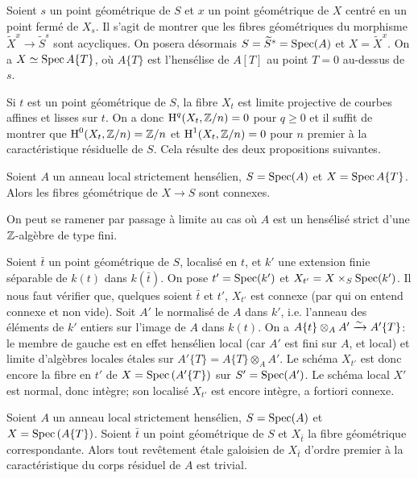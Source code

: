 \documentclass[oneside]{book}
\begin{document}
Soient $s$ un point géométrique de $S$ et $x$ un point géométrique de 
$X$ centré en un point fermé de $X_s$. Il s'agit de montrer que les fibres 
géométriques du morphisme $\widetilde X^x\to \widetilde S^s$ sont 
acycliques. On posera désormais $S=\widetilde S^s=\operatorname{Spec}(A)$ et 
$X=\widetilde X^x$. On a $X\simeq \operatorname{Spec} A\{T\}$, où $A\{T\}$ est l'hensélise 
de $A[T]$ au point $T=0$ au-dessus de $s$. 

Si $t$ est un point géométrique de $S$, la fibre $X_t$ est limite 
projective de courbes affines et lisses sur $t$. On a donc $\operatorname{H}^q(X_t,\mathbb{Z}/n) = 0$ 
pour $q\geqslant 0$ et il suffit de montrer que $\operatorname{H}^0(X_t,\mathbb{Z}/n) = \mathbb{Z}/n$ et 
$\operatorname{H}^1(X_t,\mathbb{Z}/n) = 0$ pour $n$ premier à la caractéristique résiduelle de 
$S$. Cela résulte des deux propositions suivantes. 





\begin{proposition}\label{I:5-2-2}
Soient $A$ un anneau local strictement hensélien, $S=\operatorname{Spec}(A)$ et 
$X=\operatorname{Spec} A\{T\}$. Alors les fibres géométrique de $X\to S$ sont connexes. 
\end{proposition}

On peut se ramener par passage à limite au cas où $A$ est un hensélisé 
strict d'une $\mathbb{Z}$-algèbre de type fini. 

Soient $\bar t$ un point géométrique de $S$, localisé en $t$, et $k'$ une 
extension finie séparable de $k(t)$ dans $k(\bar t)$. On pose $t'=\operatorname{Spec}(k')$ 
et $X_{t'} = X\times_S\operatorname{Spec}(k')$. Il nous faut vérifier que, quelques soient 
$\bar t$ et $t'$, $X_{t'}$ est connexe (par qui on entend connexe et non vide). 
Soit $A'$ le normalisé de $A$ dans $k'$, i.e. l'anneau des éléments de 
$k'$ entiers sur l'image de $A$ dans $k(t)$. On a 
$A\{t\}\otimes_A A'\xrightarrow\sim A'\{T\}$: le membre de gauche est en effet hensélien 
local (car $A'$ est fini sur $A$, et local) et limite d'algèbres locales 
étales sur $A'\{T\}=A\{T\}\otimes_A A'$. Le schéma $X_{t'}$ est donc encore 
la fibre en $t'$ de $X=\operatorname{Spec}\left(A'\{T\}\right)$ sur $S'=\operatorname{Spec}(A')$. Le 
schéma local $X'$ est normal, donc intègre; son localisé $X_{t'}$ est 
encore intègre, a fortiori connexe. 





\begin{proposition}\label{I:5-2-3}
Soient $A$ un anneau local strictement hensélien, $S=\operatorname{Spec}(A)$ et 
$X=\operatorname{Spec}\left(A\{T\}\right)$. Soient $\bar t$ un point géométrique de $S$ 
et $X_{\bar t}$ la fibre géométrique correspondante. Alors tout revêtement 
étale galoisien de $X_{\bar t}$ d'ordre premier à la caractéristique du 
corps résiduel de $A$ est trivial. 
\end{proposition}
\end{document}
